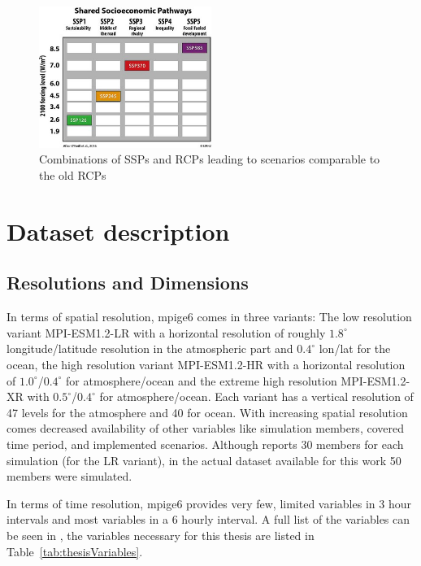 \begin{figure}[bht]
  \begin{center}
    \includegraphics[width=0.5\textwidth]{figures/ssp_rcp_matrix.jpeg}
  \end{center}
  \caption{Combinations of SSPs and RCPs leading to scenarios comparable to the old RCPs \cite{bottinger_michael_ssp_nodate}}
  \label{fig:ssprcp}
\end{figure}


\section{Dataset description}




\subsection{Resolutions and Dimensions}
\label{sec:dataset-description}

In terms of spatial resolution, \ac{mpige6} comes in three variants: The low resolution variant MPI-ESM1.2-LR with a horizontal resolution of roughly $1.8^\circ$ longitude/latitude resolution in the atmospheric part and $0.4^\circ$ lon/lat for the ocean, the high resolution variant MPI-ESM1.2-HR with a horizontal resolution of $1.0^\circ$/$0.4^\circ$ for atmosphere/ocean and the extreme high resolution MPI-ESM1.2-XR with $0.5^\circ$/$0.4^\circ$ for atmosphere/ocean. 
Each variant has a vertical resolution of 47 levels for the atmosphere and 40 for ocean.
With increasing spatial resolution comes decreased availability of other variables like simulation members, covered time period, and implemented scenarios. 
Although \cite{olonscheck_new_2023} reports 30 members for each simulation (for the LR variant), in the actual dataset available for this work 50 members were simulated. 

In terms of time resolution, \ac{mpige6} provides very few, limited variables in 3 hour intervals and most variables in a 6 hourly interval.  
A full list of the variables can be seen in \cite[Table 3]{olonscheck_new_2023}, the variables necessary for this thesis are listed in Table~\ref{tab:thesisVariables}. 

